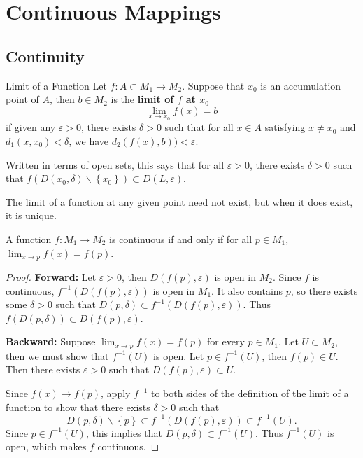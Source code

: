\documentclass[10pt]{report}
\begin{document}
\chapter{Continuous Mappings}


\section{Continuity}

\begin{defn}{Limit of a Function}{}
Let $f: A \subset M_1 \to M_2$. Suppose that $x_0$ is an accumulation point of $A$, then $b \in M_2$ is the \textbf{limit of $f$ at $x_0$} 
\[
	\lim_{x \to x_0} f(x) = b
\] 
if given any $\varepsilon>0$, there exists $\delta>0$ such that for all $x\in A$ satisfying $x\neq x_0$ and $d_1(x,x_0)<\delta$, we have $d_2(f(x),b))<\varepsilon$.

Written in terms of open sets, this says that for all $\varepsilon>0$, there exists $\delta>0$ such that $f(D(x_0,\delta) \backslash \left\{ x_0 \right\}) \subset D(L,\varepsilon)$.
\end{defn}

The limit of a function at any given point need not exist, but when it does exist, it is unique.

\begin{prop}
	A function $f:M_1\to M_2$ is continuous if and only if for all $p \in M_1$, $\lim_{x \to p} f(x) = f(p)$.
\end{prop}
\begin{proof}
	\textbf{Forward:} Let $\varepsilon>0$, then $D(f(p), \varepsilon)$ is open in $M_2$. Since $f$ is continuous, $f^{-1}(D(f(p), \varepsilon))$ is open in $M_1$. It also contains $p$, so there exists some $\delta>0$ such that $D(p,\delta) \subset f^{-1}(D(f(p),\varepsilon))$. Thus $f(D(p,\delta)) \subset D(f(p), \varepsilon)$.

	\textbf{Backward:} Suppose $\lim_{x \to p} f(x) = f(p)$ for every $p \in M_1$. Let $U \subset M_2$, then we must show that $f^{-1}(U)$ is open. Let $p \in f^{-1}(U)$, then $f(p) \in U$. Then there exists $\varepsilon>0$ such that $D(f(p),\varepsilon) \subset U$.

	Since $f(x) \to f(p)$, apply $f^{-1}$ to both sides of the definition of the limit of a function to show that there exists $\delta>0$ such that \[D(p,\delta)\backslash\left\{ p \right\} \subset f^{-1}(D(f(p),\varepsilon)) \subset f^{-1}(U).\] Since $p \in f^{-1}(U)$, this implies that $D(p,\delta) \subset f^{-1}(U)$. Thus $f^{-1}(U)$ is open, which makes $f$ continuous.
\end{proof}
\end{document}
